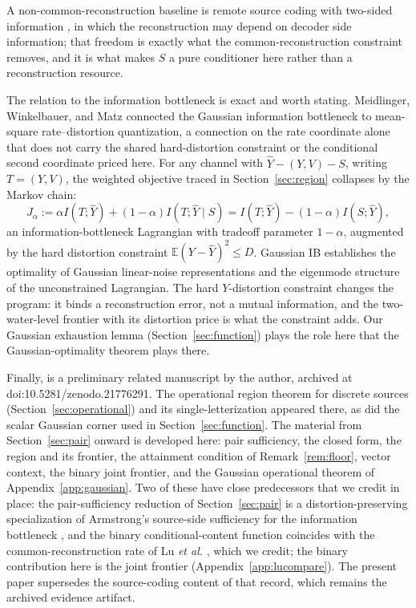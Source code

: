 \documentclass[11pt,onecolumn]{IEEEtran}
\newcommand{\E}{\mathbb{E}}
\newcommand{\hY}{\widehat{Y}}
\begin{document}
A non-common-reconstruction baseline is remote source coding with
two-sided information \cite{guler2015}, in which the reconstruction may
depend on decoder side information; that freedom is exactly what the
common-reconstruction constraint removes, and it is what makes $S$ a pure
conditioner here rather than a reconstruction resource.

The relation to the information bottleneck
\cite{tishby1999} is exact and worth stating. Meidlinger, Winkelbauer,
and Matz \cite{meidlinger2014} connected the Gaussian information
bottleneck to mean-square rate--distortion quantization, a connection on
the rate coordinate alone that does not carry the shared hard-distortion
constraint or the conditional second coordinate priced here. For any
channel with
$\hY-(Y,V)-S$, writing $T=(Y,V)$, the weighted objective traced in
Section~\ref{sec:region} collapses by the Markov chain:
\begin{equation}
J_\alpha:=\alpha I(T;\hY)+(1-\alpha)I(T;\hY\mid S)
=I(T;\hY)-(1-\alpha)I(S;\hY),
\label{eq:ib-identity}
\end{equation}
an information-bottleneck Lagrangian with tradeoff parameter
$1-\alpha$, augmented by the hard distortion constraint
$\E(Y-\hY)^2\le D$. Gaussian IB \cite{chechik2005} establishes the
optimality of Gaussian linear-noise representations and the eigenmode
structure of the unconstrained Lagrangian. The hard $Y$-distortion
constraint changes the program: it binds a reconstruction error, not a
mutual information, and the two-water-level frontier with its
distortion price is what the constraint adds. Our Gaussian exhaustion
lemma (Section~\ref{sec:function}) plays the role here that the
Gaussian-optimality theorem plays there.

Finally, \cite{bond2026landauer} is a preliminary related manuscript
by the author, archived at doi:10.5281/zenodo.21776291. The operational region theorem for discrete sources
(Section~\ref{sec:operational}) and its single-letterization appeared
there, as did the scalar Gaussian corner used in
Section~\ref{sec:function}. The material from Section~\ref{sec:pair}
onward is developed here: pair sufficiency, the closed form, the region and
its frontier, the attainment condition of Remark~\ref{rem:floor}, vector context, the
binary joint frontier, and the Gaussian operational theorem of
Appendix~\ref{app:gaussian}. Two of these have close predecessors that we
credit in place: the pair-sufficiency reduction of Section~\ref{sec:pair}
is a distortion-preserving specialization of Armstrong's source-side
sufficiency for the information bottleneck \cite{armstrong2026}, and the
binary conditional-content function coincides with the common-reconstruction
rate of Lu \emph{et al.} \cite{lu2016lossy}, which we credit; the binary
contribution here is the joint frontier (Appendix~\ref{app:lucompare}). The present paper supersedes the
source-coding content of that record, which remains the archived
evidence artifact.
\end{document}
